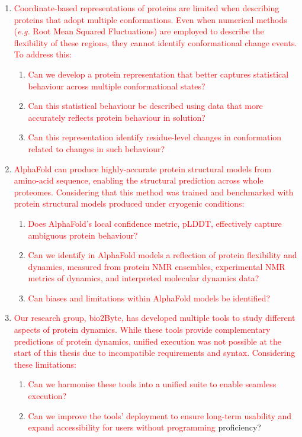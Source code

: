\begin{enumerate}
    \item \textcolor{red}{Coordinate-based representations of proteins are limited when describing proteins that adopt multiple conformations. Even when numerical methods (\textit{e.g.} Root Mean Squared Fluctuations) are employed to describe the flexibility of these regions, they cannot identify conformational change events. To address this:} 
    \begin{enumerate}
        \item \textcolor{red}{Can we develop a protein representation that better captures statistical behaviour across multiple conformational states?}
        \item \textcolor{red}{Can this statistical behaviour be described using data that more accurately reflects protein behaviour in solution?}
        \item \textcolor{red}{Can this representation identify residue-level changes in conformation related to changes in such behaviour?}
    \end{enumerate}
    
    \item \textcolor{red}{AlphaFold can produce highly-accurate protein structural models from amino-acid sequence, enabling the structural prediction across whole proteomes. Considering that this method was trained and benchmarked with protein structural models produced under cryogenic conditions: }
    \begin{enumerate}
        \item \textcolor{red}{Does AlphaFold's local confidence metric, pLDDT, effectively capture ambiguous protein behaviour?}
        \item \textcolor{red}{Can we identify in AlphaFold models a reflection of protein flexibility and dynamics, measured from protein NMR ensembles, experimental NMR metrics of dynamics, and interpreted molecular dynamics data?}
        \item \textcolor{red}{Can biases and limitations within AlphaFold models be identified?}
    \end{enumerate}

    \item \textcolor{red}{Our research group, bio2Byte, has developed multiple tools to study different aspects of protein dynamics. While these tools provide complementary predictions of protein dynamics, unified execution was not possible at the start of this thesis due to incompatible requirements and syntax. Considering these limitations: }
    \begin{enumerate}
        \item \textcolor{red}{Can we harmonise these tools into a unified suite to enable seamless execution?}
        \item \textcolor{red}{Can we improve the tools' deployment to ensure long-term usability and expand accessibility for users without programming }proficiency?
    \end{enumerate}
\end{enumerate}



